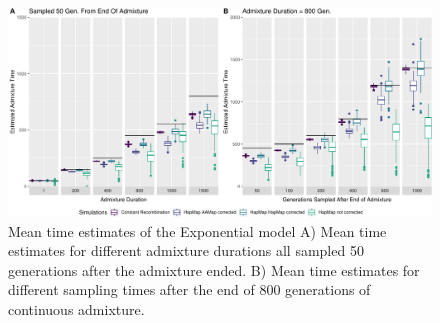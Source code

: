 \documentclass[]{article}
\begin{document}
\begin{figure}
\centering
\includegraphics{Admixture_Time_Inference_Paper_Draft_files/figure-latex/figS3-1.pdf}
\caption{\label{fig:figS2} Mean time estimates of the Exponential model A) Mean time estimates for different 
admixture durations all sampled 50 generations after the admixture ended. B) Mean time estimates for different sampling times after the end of 800
generations of continuous admixture.}
\end{figure}
\end{document}
